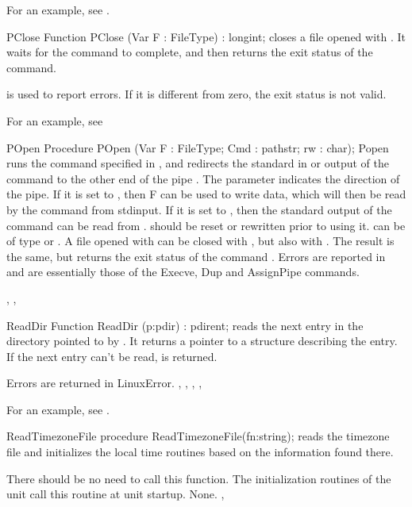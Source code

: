 For an example, see .


\begin{function}{PClose}
\Declaration
Function PClose (Var F : FileType) : longint;
\Description
  closes a file opened with . It waits for the
command to complete, and then returns the exit status of the command. 

\Errors
{} is used to report errors. If it is different from zero,
the exit status is not valid.
\SeeAlso
{}
\end{function}
For an example, see 

\begin{procedure}{POpen}
\Declaration
Procedure POpen (Var F : FileType; Cmd : pathstr; rw : char);
\Description
 Popen runs the command specified in ,
 and redirects the standard in or output of the
command to the other end of the pipe . The parameter 
indicates the direction of the pipe. If it is set to , then F can
be used to write data, which will then be read by the command from stdinput.
If it is set to , then the standard output of the command can be 
read from .  should be reset or rewritten prior to using it.
 can be of type  or .
A file opened with  can be closed with , but also
with . The result is the same, but  returns the
exit status of the command .
\Errors
Errors are reported in  and are essentially those of the
Execve, Dup and AssignPipe commands.

\SeeAlso
{}, , 
\end{procedure}


\begin{function}{ReadDir}
\Declaration
Function ReadDir (p:pdir) : pdirent;
\Description
{} reads the next entry in the directory pointed to by .
It returns a  pointer to a structure describing the entry.
If the next entry can't be read,  is returned.

\Errors
Errors are returned in LinuxError.
\SeeAlso
{}, , , ,
\end{function}

For an example, see .

\begin{procedure}{ReadTimezoneFile}
\Declaration
procedure ReadTimezoneFile(fn:string);
\Description
{} reads the timezone file  and initializes
the local time routines based on the information found there.

There should be no need to call this function. The initialization routines
of the  unit call this routine at unit startup.
\Errors 
None.
\SeeAlso
{}, 
\end{procedure}


